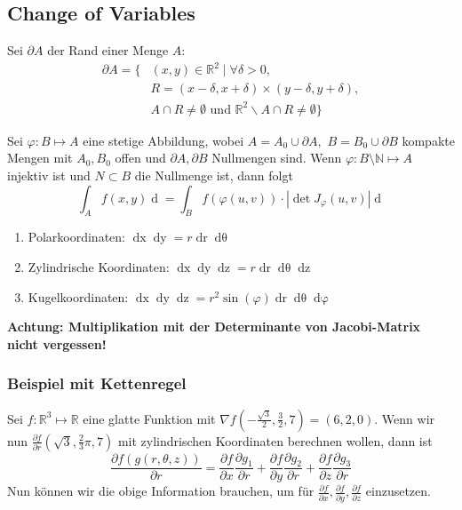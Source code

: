 \documentclass[a4paper,fontsize = 8pt]{scrartcl}
\def\R{\mathbb{R}}
\def\N{\mathbb{N}}
\begin{document}
\subsection{Change of Variables}
Sei \(\partial A\) der Rand einer Menge \(A\):
\begin{align*}
    \partial A = \Big\{ &(x,y) \in \R^2 \mid \forall \delta > 0, \\ &R = (x - \delta, x + \delta) \times (y - \delta, y + \delta), \\
    &A \cap R \neq \emptyset \text{ und } \R^2 \backslash A \cap R \neq \emptyset \Big\}
\end{align*}

Sei \(\varphi : B \mapsto A\) eine stetige Abbildung, wobei \(A= A_0 \cup \partial A, \) \(B = B_0 \cup \partial B\) kompakte Mengen mit \(A_0, B_0\) offen und \(\partial A, \partial B\) Nullmengen sind. Wenn \(\varphi : B \setminus \N \mapsto A\) injektiv ist und \(N \subset B\) die Nullmenge ist, dann folgt
\[\int_A f(x,y) \mathop{d(x,y)} = \int_B f(\varphi(u,v)) \cdot \left|\det J_\varphi (u,v)\right| \mathop{d(u,v)}\]
\begin{enumerate}
  \item Polarkoordinaten: \(\mathop{dx}\mathop{dy} = r \mathop{dr} \mathop{d\theta}\)
  \item Zylindrische Koordinaten: \(\mathop{dx} \mathop{dy} \mathop{dz} = r \mathop{dr} \mathop{d\theta} \mathop{dz}\)
  \item Kugelkoordinaten: \(\mathop{dx}\mathop{dy}\mathop{dz} = r^2 \sin(\varphi) \mathop{dr} \mathop{d\theta} \mathop{d\varphi}\)
\end{enumerate}

\textbf{Achtung: Multiplikation mit der Determinante von Jacobi-Matrix nicht vergessen!}

\subsubsection*{Beispiel mit Kettenregel}
Sei \(f: \R^3 \mapsto \R\) eine glatte Funktion mit \(\nabla f \left(-\frac{\sqrt{3}}{2}, \frac{3}{2},7\right) = (6,2,0)\). Wenn wir nun \(\frac{\partial f}{\partial r}\left(\sqrt{3}, \frac{2}{3}\pi, 7\right)\) mit zylindrischen Koordinaten berechnen wollen, dann ist
\[\frac{\partial f(g(r,\theta,z))}{\partial r} = \frac{\partial f}{\partial x} \frac{\partial g_1}{\partial r} + \frac{\partial f}{\partial y} \frac{\partial g_2}{\partial r} + \frac{\partial f}{\partial z} \frac{\partial g_3}{\partial r}\]
Nun können wir die obige Information brauchen, um für \(\frac{\partial f}{\partial x}, \frac{\partial f}{\partial y}, \frac{\partial f}{\partial z}\) einzusetzen.
\end{document}
